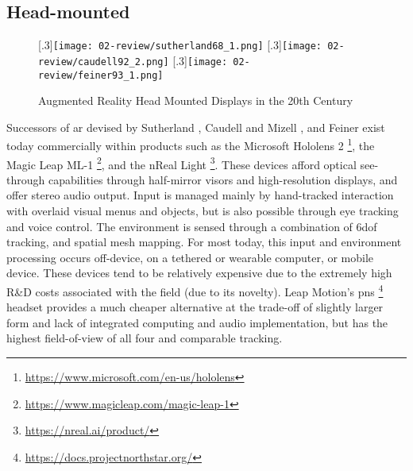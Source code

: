 \subsection{Head-mounted}\label{sec: ar-forms-hmd}
\begin{figure}
    \centering
    \captionsetup{justification=centering}
    [.3\linewidth]{\texttt{[image: 02-review/sutherland68\_1.png]}}
    \hfill
    [.3\linewidth]{\texttt{[image: 02-review/caudell92\_2.png]}}
    \hfill
    [.3\linewidth]{\texttt{[image: 02-review/feiner93\_1.png]}}%
    \caption{Augmented Reality Head Mounted Displays in the 20th Century}
    \label{fig: historicalHMDs}
\end{figure}
Successors of \gls{ar}  devised by Sutherland \citeyearpar{sutherland1968}, Caudell and Mizell \citeyearpar{caudell1992}, and Feiner \citeyearpar{feiner1993,feiner1997} exist today commercially within products such as the Microsoft Hololens 2 \footnote{\url{https://www.microsoft.com/en-us/hololens}}, the Magic Leap ML-1 \footnote{\url{https://www.magicleap.com/magic-leap-1}}, and the nReal Light \footnote{\url{https://nreal.ai/product/}}. These devices afford optical see-through capabilities through half-mirror visors and high-resolution displays, and offer stereo audio output. Input is managed mainly by hand-tracked interaction with overlaid visual menus and objects, but is also possible through eye tracking and voice control. The environment is sensed through a combination of \gls{6dof} tracking, and spatial mesh mapping. For most  today, this input and environment processing occurs off-device, on a tethered or wearable computer, or mobile device. These devices tend to be relatively expensive due to the extremely high R\&D costs associated with the field (due to its novelty). Leap Motion's  \gls{pns} \footnote{\url{https://docs.projectnorthstar.org/}} headset provides a much cheaper alternative at the trade-off of slightly larger form and lack of integrated computing and audio implementation, but has the highest field-of-view of all four and comparable tracking.

